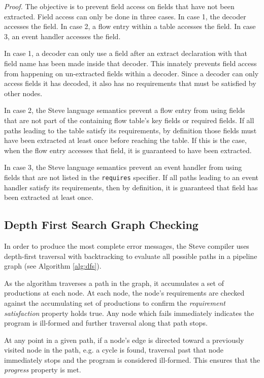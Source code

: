\textit{Proof.} 
The objective is to prevent field access on fields that have not been extracted. Field access can only be done in three cases. In case 1, the decoder accesses the field.
In case 2, a flow entry within a table accesses the field. In case 3, an event
handler accesses the field.

In case 1, a decoder can only use a field after an extract declaration with
that field name has been made inside that decoder. This innately prevents field access from happening on
un-extracted fields within a decoder. Since a decoder can only access fields it has decoded, it also has no requirements that must be satisfied by other nodes.

In case 2, the Steve language semantics prevent a flow entry from using
fields that are not part of the containing flow table's key fields or
required fields. If all paths leading to the table satisfy its requirements,
by definition those fields must have been extracted at least once before
reaching the table. If this is the case, when the flow entry accesses that
field, it is guaranteed to have been extracted.

In case 3, the Steve language semantics prevent an event handler from using fields
that are not listed in the \texttt{requires} specifier. If all paths
leading to an event handler satisfy its requirements, then by definition, it is guaranteed that field has been extracted at least once.

\subsection{Depth First Search Graph Checking} \label{guide:dfs_desc}

In order to produce the most complete error messages, the Steve compiler uses depth-first traversal with backtracking to evaluate all possible paths in a pipeline graph (see Algorithm \ref{alg:dfs}). 

As the algorithm traverses a path in the graph, it accumulates a set of productions at each node. At each node, the node's requirements are checked against the accumulating set of productions to confirm the \textit{requirement satisfaction} property holds true. Any node which fails immediately indicates the program is ill-formed and further traversal along that path stops.

At any point in a given path, if a node's edge is directed toward a previously visited node in the path, e.g. a cycle is found, traversal past that node immediately stops and the program is considered ill-formed. This ensures that the \textit{progress} property is met.

